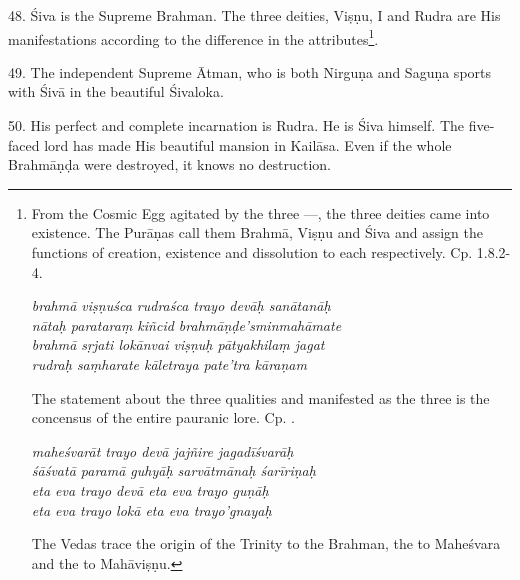 48. Śiva is the Supreme Brahman. The three deities, Viṣṇu, I and Rudra are His
manifestations according to the difference in the attributes\footnote{From
the Cosmic Egg agitated by the three —,
the three deities came into existence. The Purāṇas call them Brahmā, Viṣṇu and
Śiva and assign the functions of creation, existence and dissolution to each
respectively. Cp.  1.8.2-4.

\begin{shloka}\itshape
  brahmā viṣṇuśca rudraśca trayo devāḥ sanātanāḥ\\
  nātaḥ parataraṃ kiñcid brahmāṇḍe'sminmahāmate\\
  brahmā sṛjati lokānvai viṣṇuḥ pātyakhilaṃ jagat\\
  rudraḥ saṃharate kāletraya pate'tra kāraṇam
\end{shloka}

The statement about the three qualities  and 
manifested as the three  is the concensus of the entire pauranic lore.
Cp. .

\begin{shloka}\itshape
  maheśvarāt trayo devā jajñire jagadīśvarāḥ\\
  śāśvatā paramā guhyāḥ sarvātmānaḥ śarīriṇaḥ\\
  eta eva trayo devā eta eva trayo guṇāḥ\\
  eta eva trayo lokā eta eva trayo'gnayaḥ
\end{shloka}

The Vedas trace the origin of the Trinity to the Brahman, the  to
Maheśvara and the  to Mahāviṣṇu.}.

49. The independent Supreme Ātman, who is both Nirguṇa and Saguṇa sports with
Śivā in the beautiful Śivaloka.

50. His perfect and complete incarnation is Rudra. He is Śiva himself.
The five-faced lord has made His beautiful mansion in Kailāsa. Even if the whole
Brahmāṇḍa were destroyed, it knows no destruction.
